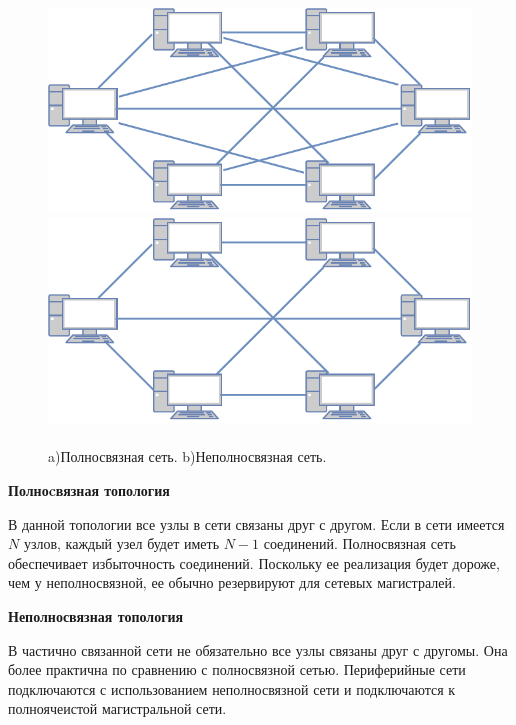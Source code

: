 \documentclass[a4paper]{article}
\begin{document}
\begin{figure}[H]
	\begin{minipage}[h]{0.45\linewidth}
	\includegraphics[width=1\linewidth]{full.pdf}
	\end{minipage}
	\hfill 
	\begin{minipage}[h]{0.43\linewidth}
	\includegraphics[width=1\linewidth]{partial.pdf}
	\end{minipage}
    \caption{\\a)\;Полносвязная сеть. b)\;Неполносвязная сеть.}
    \label{p2}
\end{figure}


\textbf{Полноcвязная топология} \par

В данной топологии все узлы в сети связаны друг с другом. Если в сети имеется $N$ узлов, каждый узел будет иметь $N-1$ соединений.
 Полносвязная сеть обеспечивает избыточность соединений. Поскольку ее реализация будет дороже, чем у неполносвязной, ее обычно резервируют для сетевых магистралей.
 
\textbf{Неполносвязная топология}

В частично связанной сети не обязательно все узлы связаны друг с другомы. Она более практична по сравнению с полносвязной сетью. 
Периферийные сети подключаются с использованием неполносвязной сети и подключаются к полноячеистой магистральной сети.
\end{document}
